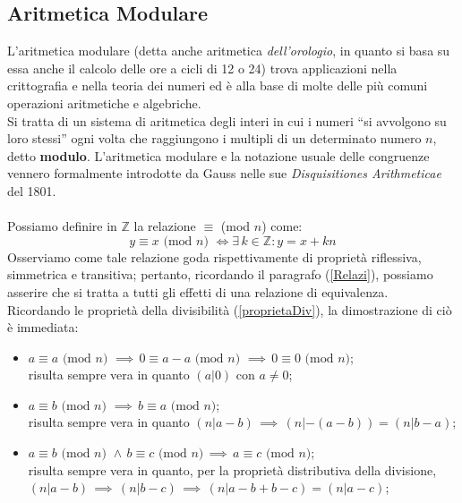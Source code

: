 \subsection{Aritmetica Modulare}
L'aritmetica modulare (detta anche aritmetica \emph{dell'orologio}, in quanto si basa su essa anche il calcolo delle ore a cicli di 12 o 24) trova applicazioni nella crittografia e nella teoria dei numeri ed è alla base di molte delle più comuni operazioni aritmetiche e algebriche.\\
Si tratta di un sistema di aritmetica degli interi in cui i numeri ``si avvolgono su loro stessi'' ogni volta che raggiungono i multipli di un determinato numero $n$, detto \textbf{modulo}. L'aritmetica modulare e la notazione usuale delle congruenze vennero formalmente introdotte da Gauss nelle sue \emph{Disquisitiones Arithmeticae} del 1801.\\\\
Possiamo definire in $\mathbb{Z}$ la relazione $\equiv$ (mod $n$) come:
\begin{equation} \label{definizioneModulo}
    y \equiv x  \text{ (mod $n$) } \Longleftrightarrow \exists \, k \in \mathbb{Z} : y = x + k n
\end{equation}
Osserviamo come tale relazione goda rispettivamente di proprietà riflessiva, simmetrica e transitiva; pertanto, ricordando il paragrafo (\ref{Relazi}), possiamo asserire che si tratta a tutti gli effetti di una relazione di equivalenza.\\
Ricordando le proprietà della divisibilità (\ref{proprietaDiv}), la dimostrazione di ciò è immediata:
\begin{itemize}
    \item $a \equiv a \text{ (mod $n$) } \implies \, 0 \equiv a - a \text{ (mod $n$) } \implies \, 0 \equiv 0 \text{ (mod $n$)}$;\\
    risulta sempre vera in quanto $(a|0)$ con $a \neq 0$;
    \item $a \equiv b \text{ (mod $n$) } \implies \, b \equiv a \text{ (mod $n$)} $;\\
    risulta sempre vera in quanto $(n|a-b)\, \implies \, (n|-(a-b)) = (n|b-a)$;
    \item $a \equiv b \text{ (mod $n$) } \land \, b \equiv c \text{ (mod $n$)}\, \implies \, a \equiv c \text{ (mod $n$)}$;\\
    risulta sempre vera in quanto, per la proprietà distributiva della divisione,  $(n|a-b)\, \implies \, (n|b-c) \, \implies \, (n|a-b+b-c) = (n|a-c)$;
\end{itemize}
